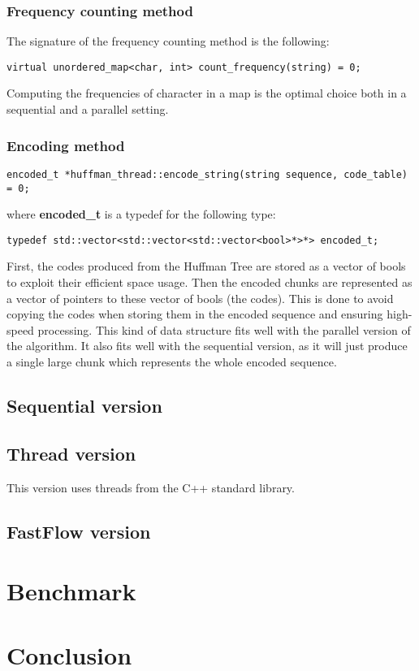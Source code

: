 \documentclass{report}
\begin{document}
\subsection*{Frequency counting method}
The signature of the frequency counting method is the following:
\begin{verbatim}
virtual unordered_map<char, int> count_frequency(string) = 0;
\end{verbatim}
Computing the frequencies of character in a map is the optimal choice
both in a sequential and a parallel setting.

\subsection*{Encoding method}

\begin{verbatim}
encoded_t *huffman_thread::encode_string(string sequence, code_table) = 0;
\end{verbatim}
where \textbf{encoded\_t} is a typedef for the following type:
\begin{verbatim}
typedef std::vector<std::vector<std::vector<bool>*>*> encoded_t;
\end{verbatim}

First, the codes produced from the Huffman Tree are stored as a vector of bools to exploit their
efficient space usage. Then the encoded chunks are represented as a vector of pointers to
these vector of bools (the codes). This is done to avoid copying the codes when storing them
in the encoded sequence and ensuring high-speed processing.
This kind of data structure fits well with the parallel version of the algorithm.
It also fits well with the sequential version, as it will just produce a single
large chunk which represents the whole encoded sequence.

\section{Sequential version}

\section{Thread version}
This version uses threads from the C++ standard library.

\section{FastFlow version}

\chapter{Benchmark}

\chapter{Conclusion}
\end{document}
